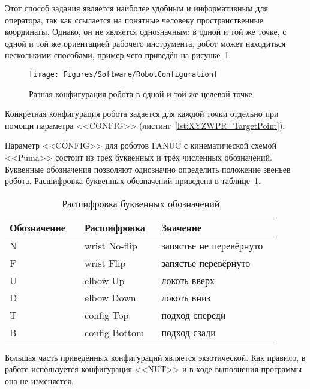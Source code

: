 Этот способ задания является наиболее удобным и информативным для оператора, так как ссылается на понятные человеку пространственные координаты.
Однако, он не является однозначным: в одной и той же точке, с одной и той же ориентацией рабочего инструмента, робот может находиться несколькими способами, пример чего приведён на рисунке~\ref{fig:RobotConfiguration}.

\begin{figure}[H]
    \centering
    \vspace{14pt}
    \texttt{[image: Figures/Software/RobotConfiguration]}
    \caption{Разная конфигурация робота в одной и той же целевой точке}
    \label{fig:RobotConfiguration}
\end{figure}

Конкретная конфигурация робота задаётся для каждой точки отдельно при помощи параметра <<CONFIG>> (листинг~\ref{lst:XYZWPR_TargetPoint}).

Параметр <<CONFIG>> для роботов FANUC с кинематической схемой <<Puma>> состоит из трёх буквенных и трёх численных обозначений.
Буквенные обозначения позволяют однозначно определить положение звеньев робота.
Расшифровка буквенных обозначений приведена в таблице~\ref{tab:RobotConfig}.

\begin{longtable}[H]{|p{0.25\linewidth}|p{0.25\linewidth}|p{0.4\linewidth}|}
    \caption{Расшифровка буквенных обозначений}
    \label{tab:RobotConfig} \\
    \hline
    Обозначение & Расшифровка   & Значение                \\ \hline
    N           & wrist No-flip & запястье не перевёрнуто \\ \hline
    F           & wrist Flip    & запястье перевёрнуто    \\ \hline
    U           & elbow Up      & локоть вверх            \\ \hline
    D           & elbow Down    & локоть вниз             \\ \hline
    T           & config Top    & подход спереди          \\ \hline
    B           & config Bottom & подход сзади            \\ \hline
\end{longtable}

Большая часть приведённых конфигураций является экзотической.
Как правило, в работе используется конфигурация <<NUT>> и в ходе выполнения программы она не изменяется.

